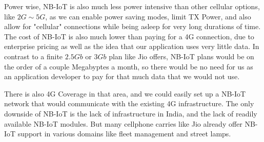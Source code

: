 Power wise, NB-IoT is also much less power intensive than other cellular options, like $2G \sim 5G$, as we can enable power saving modes, limit TX Power, and also allow for "cellular" connections while being asleep for very long durations of time. The cost of NB-IoT is also much lower than paying for a 4G connection, due to enterprise pricing as well as the idea that our application uses very little data. In contrast to a finite $2.5Gb$ or $3Gb$ plan like Jio offers, NB-IoT plans would be on the order of a couple Megabyptes a month, so there would be no need for us as an application developer to pay for that much data that we would not use. 

There is also 4G Coverage in that area, and we could easily set up a NB-IoT network that would communicate with the existing 4G infrastructure. The only downside of NB-IoT is the lack of infrastructure in India, and the lack of readily available NB-IoT modules. But many cellphone carries like Jio already offer NB-IoT support in various domains like fleet management and street lamps. 

